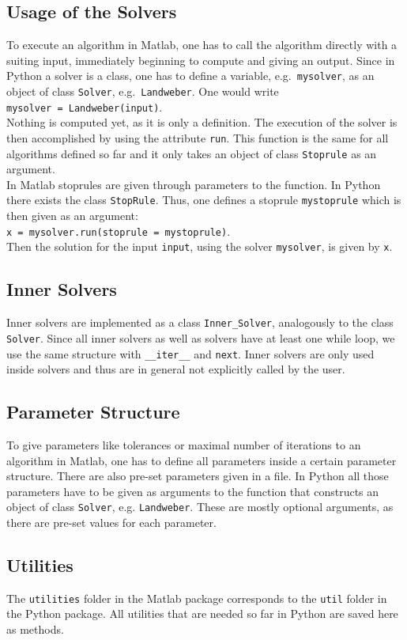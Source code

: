 \documentclass[12pt]{scrartcl}
\begin{document}
\subsection{Usage of the Solvers}
To execute an algorithm in Matlab, one has to call the algorithm directly with a suiting input, immediately beginning to compute and giving an output. Since in Python a solver is a class, one has to define a variable, e.g.\ \texttt{mysolver}, as an object of class \texttt{Solver}, e.g.\ \texttt{Landweber}. One would write\\
\texttt{mysolver = Landweber(input)}.\\
Nothing is computed yet, as it is only a definition. The execution of the solver is then accomplished by using the attribute \texttt{run}. This function is the same for all algorithms defined so far and it only takes an object of class \texttt{Stoprule} as an argument.\\
In Matlab stoprules are given through parameters to the function. In Python there exists the class \texttt{StopRule}. Thus, one defines a stoprule \texttt{mystoprule} which is then given as an argument:\\
\texttt{x = mysolver.run(stoprule = mystoprule)}.\\
Then the solution for the input \texttt{input}, using the solver \texttt{mysolver}, is given by \texttt{x}.
\subsection{Inner Solvers}
Inner solvers are implemented as a class \verb|Inner_Solver|, analogously to the class \texttt{Solver}. Since all inner solvers as well as solvers have  at least one while loop, we use the same structure with \verb|__iter__| and \texttt{next}. Inner solvers are only used inside solvers and thus are in general not explicitly called by the user.
\subsection{Parameter Structure}
To give parameters like tolerances or maximal number of iterations to an algorithm in Matlab, one has to define all parameters inside a certain parameter structure. There are also pre-set parameters given in a file. In Python all those parameters have to be given as arguments to the function that constructs an object of class \texttt{Solver}, e.g. \texttt{Landweber}. These are mostly optional arguments, as there are pre-set values for each parameter.
\subsection{Utilities}
The \texttt{utilities} folder in the Matlab package corresponds to the \texttt{util} folder in the Python package. All utilities that are needed so far in Python are saved here as methods.
\end{document}
